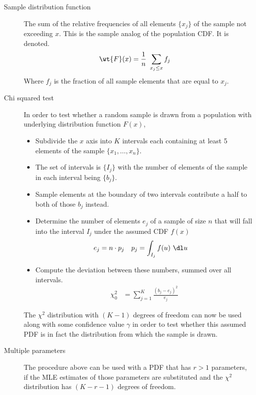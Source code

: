 \begin{description}
    \item[Sample distribution function] The sum of the relative frequencies of all
          elements $ \{x_j\} $ of the sample not exceeding $ x $. This is the sample
          analog of the population CDF. It is denoted.
          \begin{align}
              \wt{F}(x) & = \frac{1}{n}\ \sum_{x_j \leq x} f_j
          \end{align}
          Where $ f_j $ is the fraction of all sample elements that are equal to $ x_j $.

    \item[Chi squared test] In order to test whether a random sample is drawn from a
          population with underlying distribution function $ F(x) $,
          \begin{itemize}
              \item Subdivide the $x$ axis into $ K $ intervals each containing at least
                    5 elements of the sample $ \{x_1,\dots,x_n\} $.
              \item The set of intervals is $ \{I_j\} $ with the
                    number of elements of the sample in each interval being $ \{b_j\} $.
              \item Sample elements at the boundary of two intervals contribute a half to
                    both of those $ b_j $ instead.
              \item Determine the number of elements $ e_j $ of a sample of size
                    $ n $ that will fall into the interval $ I_j $ under the assumed CDF
                    $ f(x) $
                    \begin{align}
                        e_j & = n \cdot p_j & p_j & = \int_{I_j} f(u)\ \dl u
                    \end{align}
              \item Compute the deviation between these numbers, summed over all
                    intervals.
                    \begin{align}
                        \chi_0^2 & = \sum_{j=1}^{K} \frac{(b_j - e_j)^2}{e_j}
                    \end{align}
          \end{itemize}
          The $ \chi^2 $ distribution with $ (K-1) $ degrees of freedom can now be used
          along with some confidence value $ \gamma $ in order to test whether this
          assumed PDF is in fact the distribution from which the sample is drawn.

    \item[Multiple parameters] The procedure above can be used with a PDF that has
          $ r > 1 $ parameters, if the MLE estimates of those parameters are substituted
          and the $ \chi^2 $ distribution has $ (K-r-1) $ degrees of freedom.
\end{description}

